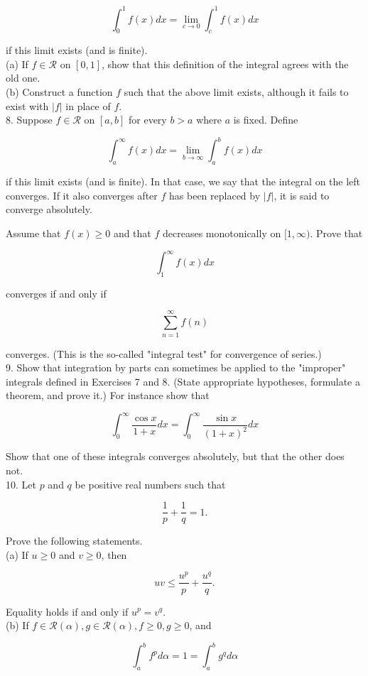 \documentclass[10pt]{article}
\begin{document}
$$
\int_{0}^{1} f(x) d x=\lim _{c \rightarrow 0} \int_{c}^{1} f(x) d x
$$

if this limit exists (and is finite).\\
(a) If $f \in \mathscr{R}$ on $[0,1]$, show that this definition of the integral agrees with the old one.\\
(b) Construct a function $f$ such that the above limit exists, although it fails to exist with $|f|$ in place of $f$.\\
8. Suppose $f \in \mathscr{R}$ on $[a, b]$ for every $b>a$ where $a$ is fixed. Define

$$
\int_{a}^{\infty} f(x) d x=\lim _{b \rightarrow \infty} \int_{a}^{b} f(x) d x
$$

if this limit exists (and is finite). In that case, we say that the integral on the left converges. If it also converges after $f$ has been replaced by $|f|$, it is said to converge absolutely.

Assume that $f(x) \geq 0$ and that $f$ decreases monotonically on $[1, \infty)$. Prove that

$$
\int_{1}^{\infty} f(x) d x
$$

converges if and only if

$$
\sum_{n=1}^{\infty} f(n)
$$

converges. (This is the so-called "integral test" for convergence of series.)\\
9. Show that integration by parts can sometimes be applied to the "improper" integrals defined in Exercises 7 and 8. (State appropriate hypotheses, formulate a theorem, and prove it.) For instance show that

$$
\int_{0}^{\infty} \frac{\cos x}{1+x} d x=\int_{0}^{\infty} \frac{\sin x}{(1+x)^{2}} d x
$$

Show that one of these integrals converges absolutely, but that the other does not.\\
10. Let $p$ and $q$ be positive real numbers such that

$$
\frac{1}{p}+\frac{1}{q}=1 .
$$

Prove the following statements.\\
(a) If $u \geq 0$ and $v \geq 0$, then

$$
u v \leq \frac{u^{p}}{p}+\frac{u^{q}}{q} .
$$

Equality holds if and only if $u^{p}=v^{q}$.\\
(b) If $f \in \mathscr{R}(\alpha), g \in \mathscr{R}(\alpha), f \geq 0, g \geq 0$, and

$$
\int_{a}^{b} f^{p} d \alpha=1=\int_{a}^{b} g^{q} d \alpha
$$
\end{document}
